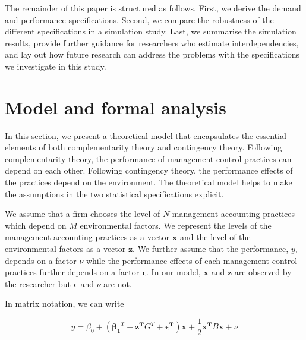 \documentclass[12pt]{article}
\begin{document}
The remainder of this paper is structured as follows. First, we derive the demand and performance specifications. Second, we compare the robustness of the different specifications in a simulation study. Last, we summarise the simulation results, provide further guidance for researchers who estimate interdependencies, and lay out how future research can address the problems with the specifications we investigate in this study.

\section{Model and formal analysis}\label{model-and-formal-analysis}

In this section, we present a theoretical model that encapsulates the essential elements of both complementarity theory and contingency theory. Following complementarity theory, the performance of management control practices can depend on each other. Following contingency theory, the performance effects of the practices depend on the environment. The theoretical model helps to make the assumptions in the two statistical specifications explicit. 

We assume that a firm chooses the level of $N$ management accounting practices which depend on $M$ environmental factors. We represent the levels of the management accounting practices as a vector $\mathbf{x}$ and the level of the environmental factors as a vector $\mathbf{z}$. We further assume that the performance, $y$, depends on a factor $\nu$ while the performance effects of each management control practices further depends on a factor $\mathbf{\epsilon}$. In our model, $\mathbf{x}$ and $\mathbf{z}$ are observed by the researcher but $\mathbf{\epsilon}$ and $\nu$ are not. 


In matrix notation, we can write

\begin{equation} \label{eq:structural-matrix}
y = \beta_0 + (\mathbf{\beta_1}^T + \mathbf{z^T} G^T + \mathbf{\epsilon^T})
     \mathbf{x} + \frac{1}{2}\mathbf{x^T} B \mathbf{x} + \nu
\end{equation}
\end{document}
